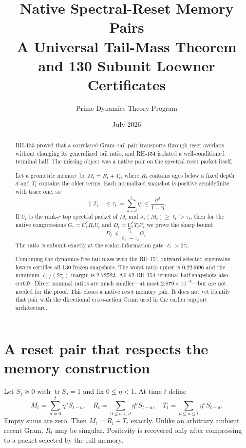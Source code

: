 \documentclass[12pt]{article}
\title{Native Spectral-Reset Memory Pairs\\\large A Universal Tail-Mass Theorem and 130 Subunit Loewner Certificates}
\author{Prime Dynamics Theory Program}
\date{July 2026}
\begin{document}
\maketitle

\begin{abstract}
RH-153 proved that a correlated Gram--tail pair transports through reset
overlaps without changing its generalized tail ratio, and RH-154 isolated a
well-conditioned terminal half.  The missing object was a native pair on the
spectral reset packet itself.

Let a geometric memory be $M_t=R_t+T_t$, where $R_t$ contains ages below a
fixed depth $d$ and $T_t$ contains the older terms.  Each normalized snapshot
is positive semidefinite with trace one, so
\[
 \|T_t\|\leq\tau_t:=\sum_{a=d}^{t}\eta^a
 \leq\frac{\eta^d}{1-\eta}.
\]
If $U_t$ is the rank-$r$ top spectral packet of $M_t$ and
$\lambda_r(M_t)\geq\ell_t>\tau_t$, then for the native compressions
$G_t=U_t^*R_tU_t$ and $D_t=U_t^*T_tU_t$ we prove the sharp bound
\[
 D_t\preceq\frac{\tau_t}{\ell_t-\tau_t}G_t.
\]
The ratio is subunit exactly at the scalar-information gate
$\ell_t>2\tau_t$.

Combining the dynamics-free tail mass with the RH-151 outward selected
eigenvalue lowers certifies all 130 frozen snapshots.  The worst ratio upper
is $0.224696$ and the minimum $\ell_t/(2\tau_t)$ margin is $2.72523$.
All 62 RH-154 terminal-half snapshots also certify.  Direct nominal ratios
are much smaller---at most $2.879\times10^{-5}$---but are not needed for the
proof.  This closes a native reset memory pair.  It does not yet identify
that pair with the directional cross-action Gram used in the earlier support
architecture.
\end{abstract}

\section{A reset pair that respects the memory construction}
Let $S_j\succeq0$ with $\operatorname{tr}S_j=1$ and fix
$0\leq\eta<1$.  At time $t$ define
\[
 M_t=\sum_{a=0}^{t}\eta^aS_{t-a},\quad
 R_t=\sum_{0\leq a<d}\eta^aS_{t-a},\quad
 T_t=\sum_{d\leq a\leq t}\eta^aS_{t-a}.
\]
Empty sums are zero.  Then $M_t=R_t+T_t$ exactly.  Unlike an arbitrary
ambient recent Gram, $R_t$ may be singular.  Positivity is recovered only
after compressing to a packet selected by the full memory.
\end{document}
